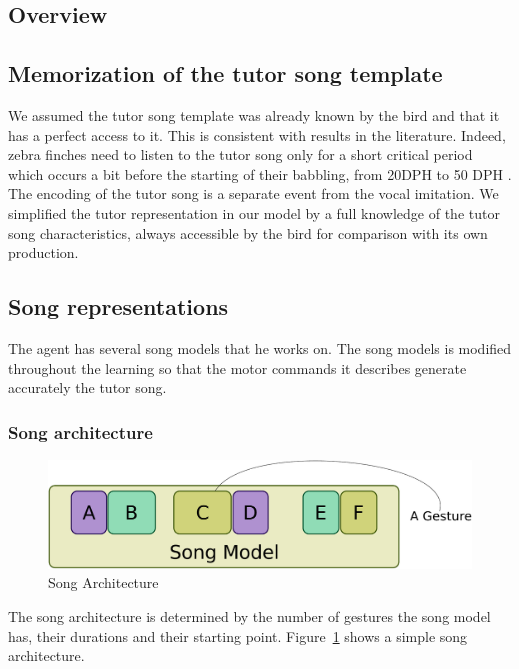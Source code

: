 \documentclass[a4paper]{report}
\begin{document}
\subsection{Overview}

\subsection{Memorization of the tutor song template}

We assumed the tutor song template was already known by the bird and that it has
a perfect access to it. This is consistent with results in the literature.
Indeed, zebra finches need to listen to the tutor song only for a short critical
period which occurs a bit before the starting of their babbling, from 20DPH to
50 DPH \parencite{deregnaucourt_how_2005, margoliash_sleep_2010}. The encoding
of the tutor song is a separate event from the vocal imitation. We simplified
the tutor representation in our model by a full knowledge of the tutor song
characteristics, always accessible by the bird for comparison with its own
production.

\subsection{Song representations}

The agent has several song models that he works on. The song models is modified
throughout the learning so that the motor commands it describes generate
accurately the tutor song.

\subsubsection{Song architecture}

\begin{figure}
\center
\includegraphics[width=0.8\linewidth]{song_model_architecture_schema}
\caption{Song Architecture\label{fig_song_arch}}
\end{figure}

The song architecture is determined by the number of gestures the song model
has, their durations and their starting point. Figure~\ref{fig_song_arch} shows
a simple song architecture.
\end{document}
